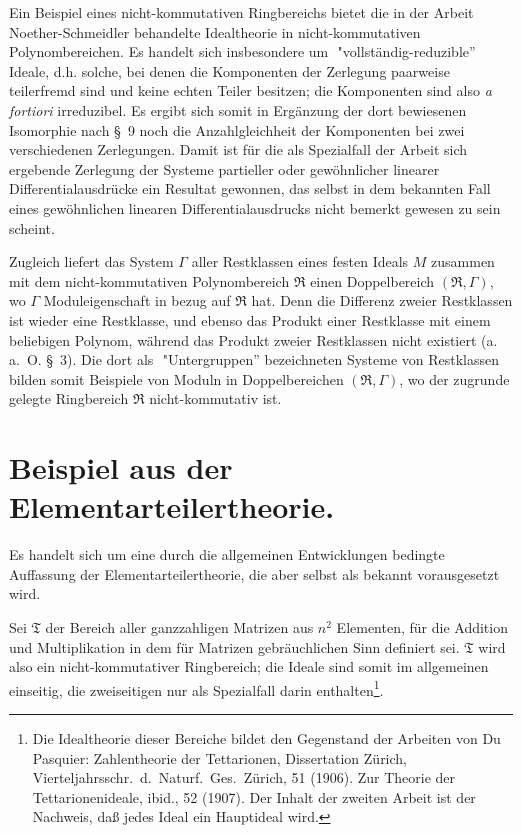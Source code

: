 \documentclass[fontsize=10pt,paper=a5,pagesize,headings=small]{scrbook}
\newcommand{\ring}[1]{\mathfrak{#1}}
\theoremstyle{plain}
\begin{document}
Ein Beispiel eines nicht-kommutativen Ringbereichs bietet die in der
Arbeit Noether-Schmeidler behandelte Idealtheorie in nicht-kommutativen
Polynombereichen. Es handelt sich insbesondere um \,\,"vollständig-reduzible\!''
Ideale, d.h. solche, bei denen die Komponenten der Zerlegung paarweise
teilerfremd sind und keine echten Teiler besitzen; die Komponenten sind
also \textit{a fortiori} irreduzibel. Es ergibt sich somit in Ergänzung der dort
bewiesenen Isomorphie nach \S~9 noch die Anzahlgleichheit der Komponenten
bei zwei verschiedenen Zerlegungen. Damit ist für die als Spezialfall der
Arbeit sich ergebende Zerlegung der Systeme partieller oder gewöhnlicher
linearer Differentialausdrücke ein Resultat gewonnen, das selbst in dem
bekannten Fall eines gewöhnlichen linearen Differentialausdrucks nicht
bemerkt gewesen zu sein scheint.

Zugleich liefert das System $\varGamma$ aller Restklassen eines festen Ideals
$M$ zusammen mit dem nicht-kommutativen Polynombereich $\ring{R}$ einen
Doppelbereich $(\ring{R}, \varGamma)$, wo $\varGamma$ Moduleigenschaft in bezug auf $\ring{R}$ hat.
Denn die Differenz zweier Restklassen ist wieder eine Restklasse, und ebenso
das Produkt einer Restklasse mit einem beliebigen Polynom, während das
Produkt zweier Restklassen nicht existiert (a.\,a.~O. \S~3). Die dort als
\,\,"Untergruppen\!'' bezeichneten Systeme von Restklassen bilden somit
Beispiele von Moduln in Doppelbereichen $(\ring{R}, \varGamma)$, wo der zugrunde
gelegte Ringbereich $\ring{R}$ nicht-kommutativ ist.

\section{Beispiel aus der Elementarteilertheorie.}
\setcounter{page}{408}

Es handelt sich um eine durch die allgemeinen Entwicklungen bedingte
Auffassung der Elementarteilertheorie, die aber selbst als bekannt
vorausgesetzt wird.

Sei $\ring{T}$ der Bereich aller ganzzahligen Matrizen aus $n^2$ Elementen,
für die Addition und Multiplikation in dem für Matrizen gebräuchlichen
Sinn definiert sei. $\ring{T}$ wird also ein nicht-kommutativer Ringbereich;
die Ideale sind somit im allgemeinen einseitig, die zweiseitigen nur als
Spezialfall darin enthalten\footnote{Die Idealtheorie dieser Bereiche bildet den
Gegenstand der Arbeiten von Du Pasquier: Zahlentheorie der Tettarionen,
Dissertation Zürich, Vierteljahrsschr.\ d.\ Naturf.\ Ges.\ Zürich, 51 (1906).
Zur Theorie der Tettarionenideale, ibid., 52 (1907). Der Inhalt der zweiten
Arbeit ist der Nachweis, daß jedes Ideal ein Hauptideal wird.}.
\end{document}
